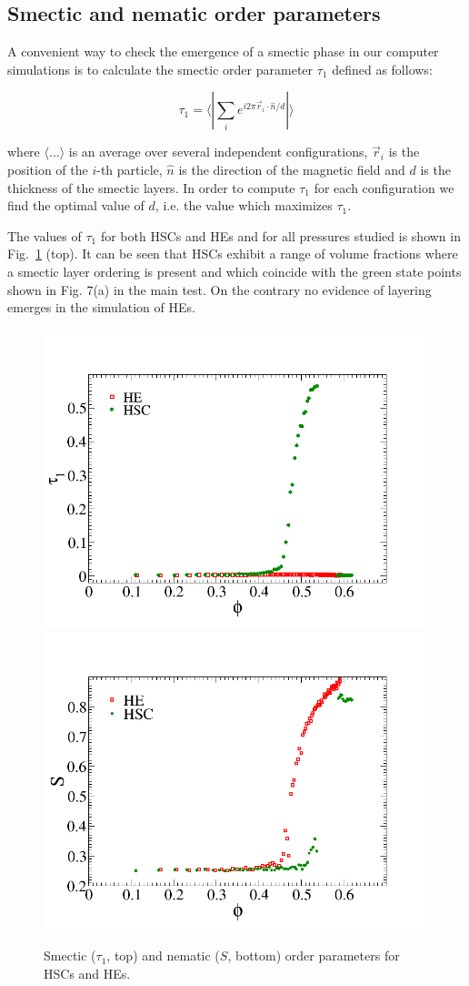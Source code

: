 \documentclass[aip,graphicx]{revtex4-1} %
\begin{document}
\subsection{Smectic and nematic order parameters}

A convenient way to check the emergence of a smectic phase in our computer simulations 
is to calculate the smectic order parameter $\tau_1$ defined as follows:

\begin{equation}
    \tau_1 = \langle | \sum_i e^{i 2\pi \vec{r}_i \cdot \hat{n} / d } |\rangle 
\end{equation}

where $\langle\ldots\rangle$ is an average over several independent configurations, $\vec{r}_i$ is the position of the $i$-th particle, $\hat{n}$ is the direction of the magnetic
field and $d$ is the thickness of the smectic layers.
In order to compute $\tau_1$ for each configuration we find the optimal value of $d$, i.e. 
the value which maximizes $\tau_1$.

The values of $\tau_1$ for both HSCs and HEs and for all pressures studied is shown in Fig.~\ref{fig:ordpars} (top). It can be seen that HSCs exhibit a range of volume fractions where 
a smectic layer ordering is present and which coincide with the green state points shown in Fig. 7(a)
in the main test. On the contrary no evidence of layering emerges in the simulation of HEs.

\begin{figure}
    \centering
    \includegraphics[width=0.45\columnwidth]{smordpar.png}
    \includegraphics[width=0.45\columnwidth]{nemop.png}  
    \caption{Smectic ($\tau_1$, top) and nematic ($S$, bottom) order parameters for HSCs and HEs.}\label{fig:ordpars}
\end{figure}
\end{document}
